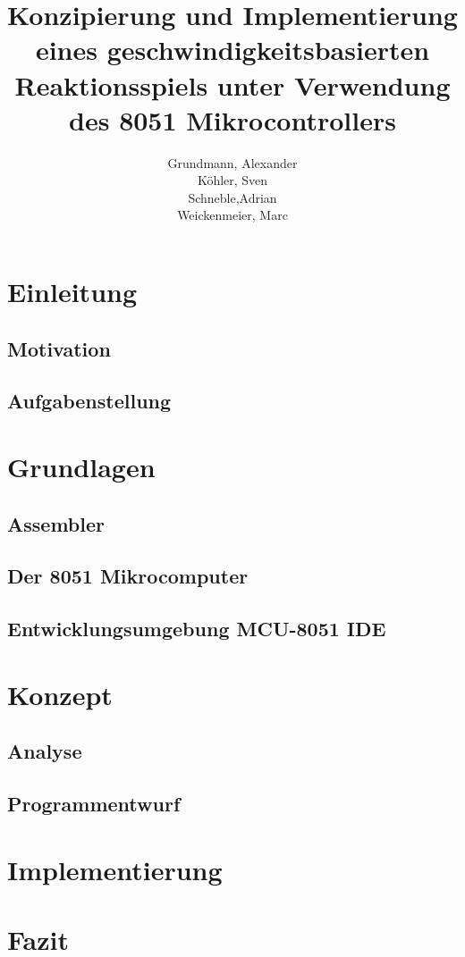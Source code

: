 \documentclass[11pt,paper=a4,ngerman]{report}
\title{Konzipierung und Implementierung eines geschwindigkeitsbasierten Reaktionsspiels unter Verwendung des 8051 Mikrocontrollers}
\author{Grundmann, Alexander\\Köhler, Sven\\Schneble,Adrian\\Weickenmeier, Marc}
\begin{document}
\maketitle

\tableofcontents

\chapter{Einleitung}
\section{Motivation}
\section{Aufgabenstellung}

\chapter{Grundlagen}
\section{Assembler}
\section{Der 8051 Mikrocomputer}
\section{Entwicklungsumgebung MCU-8051 IDE}

\chapter{Konzept}
\section{Analyse}
\section{Programmentwurf}

\chapter{Implementierung}

\chapter{Fazit}
\end{document}

